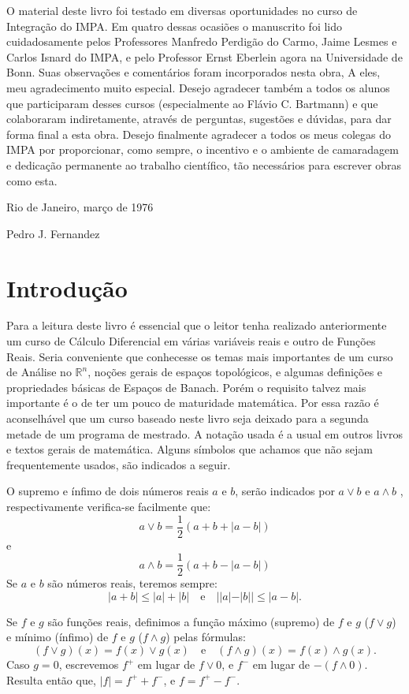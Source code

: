\documentclass[
]{book}
\begin{document}
O material deste livro foi testado em diversas oportunidades no curso de Integração do IMPA. Em quatro dessas ocasiões o manuscrito foi lido cuidadosamente pelos Professores Manfredo Perdigão do Carmo, Jaime Lesmes e Carlos Isnard do IMPA, e pelo Professor Ernst Eberlein agora na Universidade de Bonn. Suas observações e comentários foram incorporados nesta obra, A eles, meu agradecimento muito especial. Desejo agradecer também a todos os alunos que participaram desses cursos (especialmente ao Flávio C. Bartmann) e que colaboraram indiretamente, através de perguntas, sugestões e dúvidas, para dar forma final a esta obra. Desejo finalmente agradecer a todos os meus colegas do IMPA por proporcionar, como sempre, o incentivo e o ambiente de camaradagem e dedicação permanente ao trabalho científico, tão necessários para escrever obras como esta.

Rio de Janeiro, março de 1976

Pedro J. Fernandez

\chapter*{Introdução}\label{introduuxe7uxe3o}

Para a leitura deste livro é essencial que o leitor tenha realizado anteriormente um curso de Cálculo Diferencial em várias variáveis reais e outro de Funções Reais. Seria conveniente que conhecesse os temas mais importantes de um curso de Análise no \(\mathbb{R}^n\), noções gerais de espaços topológicos, e algumas definições e propriedades básicas de Espaços de Banach. Porém o requisito talvez mais importante é o de ter um pouco de maturidade matemática. Por essa razão é aconselhável que um curso baseado neste livro seja deixado para a segunda metade de um programa de mestrado. A notação usada é a usual em outros livros e textos gerais de matemática. Alguns símbolos que achamos que não sejam frequentemente usados, são indicados a seguir.

O supremo e ínfimo de dois números reais \(a\) e \(b\), serão indicados por \(a \lor b\) e \(a \land b\) , respectivamente verifica-se facilmente que: \[a \lor b = \frac{1}{2}(a + b + |a - b|)\] e \[a \land b = \frac{1}{2}(a + b - |a - b|)\] Se \(a\) e \(b\) são números reais, teremos sempre: \[|a+b| \le |a| + |b| \quad \text{e} \quad ||a|-|b|| \le |a-b|.\]

Se \(f\) e \(g\) são funções reais, definimos a função máximo (supremo) de \(f\) e \(g\) (\(f \lor g\)) e mínimo (ínfimo) de \(f\) e \(g\) (\(f \land g\)) pelas fórmulas: \[(f \lor g)(x) = f(x) \lor g(x) \quad \text{e} \quad (f \land g)(x) = f(x) \land g(x).\] Caso \(g=0\), escrevemos \(f^{+}\) em lugar de \(f \lor 0\), e \(f^{-}\) em lugar de \(-(f \land 0)\). Resulta então que, \(|f| = f^{+} + f^{-}\), e \(f = f^{+} - f^{-}\).
\end{document}
